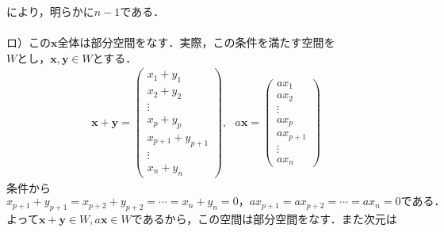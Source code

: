 \documentclass[dvipdfmx,uplatex,11pt]{jsarticle}
\begin{document}
により，明らかに$n-1$である．\\
\dotfill \\
ロ）この$\bm{x}全体は部分空間をなす．$実際，この条件を満たす空間を$Wとし，\bm{x,y} \in W$とする．
\begin{eqnarray*}
\bm{x}+\bm{y}=
\begin{pmatrix}
x_1+y_1 \\
x_2+y_2 \\
\vdots \\
x_{p}+y_{p} \\
x_{p+1}+y_{p+1} \\
\vdots \\
x_n+y_n
\end{pmatrix}
,~~~
a\bm{x}=
\begin{pmatrix}
ax_1 \\
ax_2 \\
\vdots \\
ax_{p} \\
ax_{p+1} \\
\vdots \\
ax_n
\end{pmatrix}
\end{eqnarray*}
条件から$x_{p+1}+y_{p+1}=x_{p+2}+y_{p+2}=\cdots =x_{n}+y_{n}=0，ax_{p+1}=ax_{p+2}=\cdots =ax_n=0である．$\\
よって$\bm{x}+\bm{y} \in W, a\bm{x} \in W$であるから，この空間は部分空間をなす．また次元は
\end{document}
